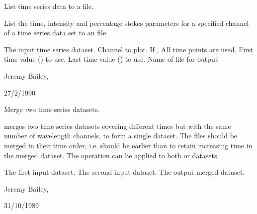 \begin{manroutinedescription}
        List time series data to a file.

        List the time, intensity and percentage stokes parameters
        for a specified channel of a time series data set to an
        {} file

\begin{manparametertable}
  The input %
time series dataset.
  Channel to plot.
  If {}, All time %
points are used.
   First time value ({}) to use.
   Last time value ({}) %
to use.
     Name of file for output

\end{manparametertable}
         Jeremy Bailey, {}

         27/2/1990

\end{manroutinedescription}
\begin{manroutinedescription}
        Merge two time series datasets.

        {} merges two time series datasets covering different %
times
        but with the same number of wavelength channels, to form a single
        dataset. The files should be merged in their time order, i.e. {}
        should be earlier than {} to retain increasing time in the
        merged dataset. The operation can be applied to both {} or {%
}
        datasets

\begin{manparametertable}
  The first input dataset.
  The second input dataset.
  The output merged dataset.

\end{manparametertable}
          Jeremy Bailey, {}

          31/10/1989

\end{manroutinedescription}
